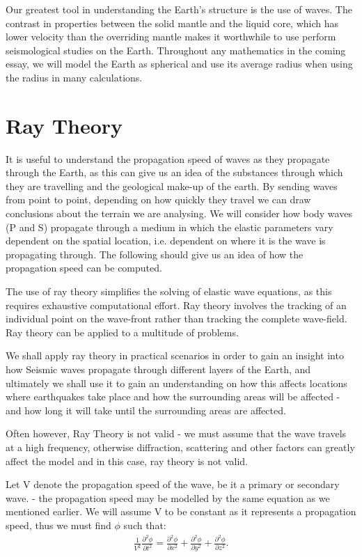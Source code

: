 \documentclass{mm2}
\begin{document}
Our greatest tool in understanding the Earth's structure is the use of waves. The contrast in properties between the solid mantle and the liquid core, which has lower velocity than the overriding mantle makes it worthwhile to use perform seismological studies on the Earth. Throughout any mathematics in the coming essay, we will model the Earth as spherical and use its average radius when using the radius in many calculations.
\section{Ray Theory}
\begin{answer}{1}
It is useful to understand the propagation speed of waves as they propagate through the Earth, as this can give us an idea of the substances through which they are travelling and the geological make-up of the earth. By sending waves from point to point, depending on how quickly they travel we can draw conclusions about the terrain we are analysing.
We will consider how body waves (P and S) propagate through a medium in which the elastic parameters vary dependent on the spatial location, i.e. dependent on where it is the wave is propagating through.
The following should give us an idea of how the propagation speed can be computed.

The use of ray theory simplifies the solving of elastic wave equations, as this requires exhaustive computational effort. Ray theory involves the tracking of an individual point on the wave-front rather than tracking the complete wave-field. Ray theory can be applied to a multitude of problems.

We shall apply ray theory in practical scenarios in order to gain an insight into how Seismic waves propagate through different layers of the Earth, and ultimately we shall use it to gain an understanding on how this affects locations where earthquakes take place and how the surrounding areas will be affected - and how long it will take until the surrounding areas are affected. 

Often however, Ray Theory is not valid - we must assume that the wave travels at a high frequency, otherwise diffraction, scattering and other factors can greatly affect the model and in this case, ray theory is not valid.

Let V denote the propagation speed of the wave, be it a primary or secondary wave. - the propagation speed may be modelled by the same equation as we mentioned earlier. We will assume V to be constant as it represents a propagation speed, thus we must find $\phi$ such that:
\begin{eqnarray}
\frac{1}{V^2}\frac{\partial^2 \phi}{\partial t^2}=\frac{\partial^2 \phi}{\partial x^2}+\frac{\partial^2 \phi}{\partial y^2}+
\frac{\partial^2 \phi}{\partial z^2}.
\label{eq_wave}
\end{eqnarray}


\end{answer}
\end{document}
